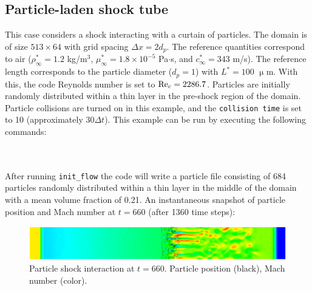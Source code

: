 \documentclass[12pt]{article}
\newcommand{\code}[1]{\texttt{#1}}
\begin{document}
\subsection{Particle-laden shock tube}
This case considers a shock interacting with a curtain of particles. The domain is of size $513\times 64$ with grid spacing $\Delta x = 2d_p$. The reference quantities correspond to air ($\rho_\infty^*=1.2$ kg/m$^3$, $\mu_\infty^*=1.8\times 10^{-5}$ Pa$\cdot$s, and $c_\infty^*=343$ m/s). The reference length corresponds to the particle diameter ($d_p=1$) with $L^*=100$ $\upmu$m. With this, the code Reynolds number is set to ${\rm Re}_c=2286.7$. Particles are initially randomly distributed within a thin layer in the pre-shock region of the domain. Particle collisions are turned on in this example, and the \code{collision time} is set to 10 (approximately $30\Delta t$). This example can be run by executing the following commands:
\\\\
\vspace{1em}
\vspace{.5em}
\\
After running \code{init\_flow} the code will write a particle file consisting of 684 particles randomly distributed within a thin layer in the middle of the domain with a mean volume fraction of 0.21. An instantaneous snapshot of particle position and Mach number at $t=660$ (after 1360 time steps):
 \begin{figure}[h]
	\begin{center}
		\includegraphics[scale=0.5]{fig/particle_shock}
		\caption{Particle shock interaction at $t=660$. Particle position (black), Mach number (color).}
		\label{fig:sod}
	\end{center}
\end{figure}
\end{document}
